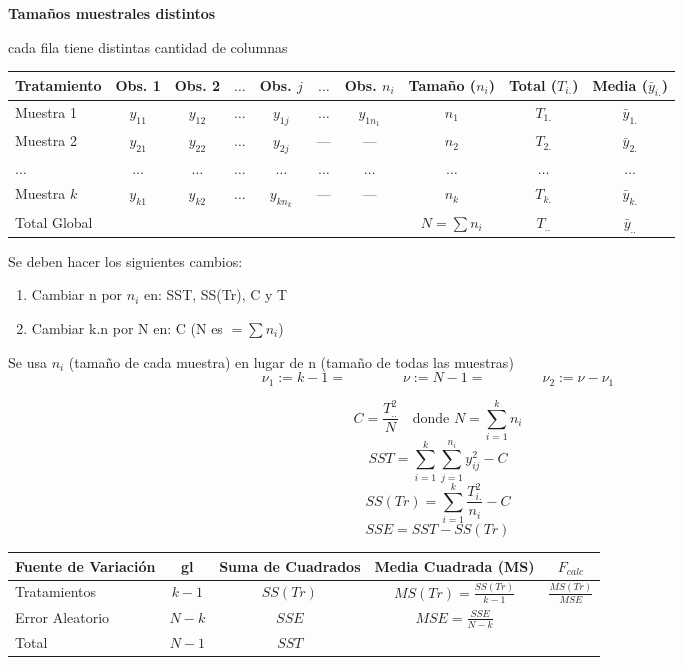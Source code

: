 \documentclass[10pt,a4paper]{article}
\begin{document}
\begin{center}
{\large\bfseries Tamaños muestrales distintos}
\end{center}
\vspace{-2pt}

cada fila tiene distintas cantidad de columnas

\begin{center}
\vspace{-2pt}
{\small
\begin{tabular}{l c c c c c c | c c c}
\toprule
Tratamiento & Obs. 1 & Obs. 2 & $\ldots$ & Obs. $j$ & $\ldots$ & Obs. $n_i$ & Tamaño ($n_i$) & Total ($T_{i.}$) & Media ($\bar{y}_{i.}$) \\
\midrule
Muestra 1 & $y_{11}$ & $y_{12}$ & $\ldots$ & $y_{1j}$ & $\ldots$ & $y_{1n_1}$ & $n_1$ & $T_{1.}$ & $\bar{y}_{1.}$ \\
Muestra 2 & $y_{21}$ & $y_{22}$ & $\ldots$ & $y_{2j}$ & --- & --- & $n_2$ & $T_{2.}$ & $\bar{y}_{2.}$ \\
$\ldots$ & $\ldots$ & $\ldots$ & $\ldots$ & $\ldots$ & $\ldots$ & $\ldots$ & $\ldots$ & $\ldots$ & $\ldots$ \\
Muestra $k$ & $y_{k1}$ & $y_{k2}$ & $\ldots$ & $y_{kn_k}$ & --- & --- & $n_k$ & $T_{k.}$ & $\bar{y}_{k.}$ \\
\midrule
Total Global & & & & & & & $N=\sum n_i$ & $T_{..}$ & $\bar{y}_{..}$ \\
\bottomrule
\end{tabular}
}
\end{center}

Se deben hacer los siguientes cambios:
\begin{enumerate}[leftmargin=20pt,itemsep=0pt,topsep=1pt,parsep=0pt]
  \item Cambiar n por $n_i$ en: SST, SS(Tr), C y T
  \item Cambiar k.n por N en: C (N es $=\sum n_i$)
\end{enumerate}
Se usa $n_i$ (tamaño de cada muestra) en lugar de n (tamaño de todas las muestras)
\[
\nu_1 := k-1 = \qquad\qquad \nu := N-1 = \qquad\qquad \nu_2 := \nu - \nu_1
\]

\[
C = \frac{T_{..}^2}{N} \quad \text{donde } N=\sum_{i=1}^{k} n_i
\]
\[
SST = \sum_{i=1}^{k}\sum_{j=1}^{n_i} y_{ij}^2 - C
\]
\[
SS(Tr) = \sum_{i=1}^{k} \frac{T_{i.}^2}{n_i} - C
\]
\[
SSE = SST - SS(Tr)
\]

\begin{center}
\vspace{-2pt}
{\small
\begin{tabular}{l c c c c}
\toprule
\textbf{Fuente de Variación} & \textbf{gl} & \textbf{Suma de Cuadrados} & \textbf{Media Cuadrada (MS)} & $F_{calc}$ \\
\midrule
Tratamientos & $k-1$ & $SS(Tr)$ & $MS(Tr)=\frac{SS(Tr)}{k-1}$ & $\frac{MS(Tr)}{MSE}$ \\
Error Aleatorio & $N-k$ & $SSE$ & $MSE=\frac{SSE}{N-k}$ & \\
\midrule
Total & $N-1$ & $SST$ & & \\
\bottomrule
\end{tabular}
}
\end{center}
\end{document}
